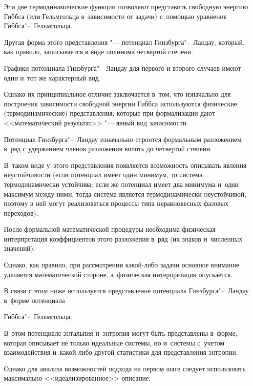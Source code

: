Эти две термодинамические функции позволяют представить свободную энергию Гиббса (или Гельмгольца в~зависимости от задачи) с~помощью уравнения Гиббса"--~Гельмгольца.



Другая форма этого представления "--- потенциал Гинзбурга"--~Ландау, который, как правило, записывается в виде полинома четвертой степени. 

Графики потенциала Гинзбурга"--~Ландау для первого и второго случаев имеют один и~тот же характерный вид. 

Однако их принципиальное отличие заключается в~том, что изначально для построения зависимости свободной энергии Гиббса используются физические (термодинамические) представления, которые при формализации дают <<математический результат>> "--- явный вид зависимости. 



Потенциал Гинзбурга"--~Ландау изначально строится формальным разложением в~ряд с удержанием членов разложения вплоть до четвертой степени. 

В~таком виде у~этого представления появляется возможность описывать явления неустойчивости (если потенциал имеет один минимум, то система термодинамически устойчива; если же потенциал имеет два минимума и~один максимум между ними, тогда система является термодинамически неустойчивой, поэтому в ней могут реализоваться процессы типа неравновесных фазовых переходов). 

После формальной математической процедуры необходима физическая интерпретация коэффициентов этого разложения в~ряд (их знаков и~численных значений). 

Однако, как правило, при рассмотрении какой-либо задачи основное внимание уделяется математической стороне, а~физическая интерпретация опускается.



В связи с этим ниже используется представление потенциала Гинзбурга"--~Ландау в~форме потенциала 

Гиббса"--~Гельмгольца. 

В~этом потенциале энтальпия и~энтропия могут быть представлены в~форме, которая описывает не только  идеальные системы, но и~системы с~учетом взаимодействия и~какой-либо другой статистики для представления энтропии. 

Однако для анализа возможностей подхода на первом шаге следует использовать максимально <<идеализированное>> описание.



